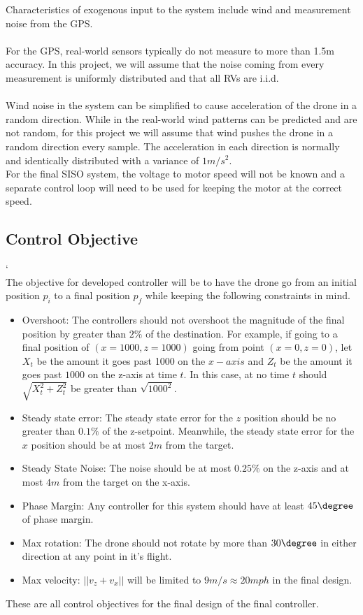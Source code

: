     Characteristics of exogenous input to the system include wind and measurement noise from the GPS.\\
    \\
    For the GPS, real-world sensors typically do not measure to more than 1.5m accuracy.
    In this project, we will assume that the noise coming from every measurement is uniformly distributed
    and that all RVs are i.i.d.\\
    \\
    Wind noise in the system can be simplified to cause acceleration of the drone in a random direction.
    While in the real-world wind patterns can be predicted and are not random, for this project we will assume that wind
    pushes the drone in a random direction every sample.
    The acceleration in each direction is normally and identically distributed with a variance of $1m/s^2$.
    \\
    For the final SISO system, the voltage to motor speed will not be known and a separate control loop will need to be used
    for keeping the motor at the correct speed.

    \subsection{Control Objective}\label{subsec:control-objective}
`   \\
    The objective for developed controller will be to have the drone go from an initial position $p_i$ to
    a final position $p_f$ while keeping the following constraints in mind.\\
    \begin{itemize}
        \item Overshoot: The controllers should not overshoot the magnitude of the final position by
            greater than $2\%$ of the destination.
            For example, if going to a final position of $(x = 1000, z = 1000)$
            going from point $(x=0, z=0)$, let $X_t$ be the amount it goes past 1000 on the $x-axis$ and
            $Z_t$ be the amount it goes past $1000$ on the z-axis at time $t$.
            In this case, at no time $t$ should $\sqrt{X_t^2 + Z_t^2}$ be greater than $\sqrt{1000^2}$.
        \item Steady state error: The steady state error for the $z$ position should be no greater than $0.1\%$ of the
            z-setpoint.
            Meanwhile, the steady state error for the $x$ position should be at most $2m$ from the target.
        \item Steady State Noise: The noise should be at most $0.25\%$ on the z-axis and at most $4m$ from the target
            on the x-axis.
        \item Phase Margin: Any controller for this system should have at least $45 \degree$ of phase margin.
        \item Max rotation: The drone should not rotate by more than $30 \degree$ in either direction at any point in it's flight.
        \item Max velocity: $||v_z + v_x||$ will be limited to $9m/s \approx 20 mph$ in the final design.
    \end{itemize}

    These are all control objectives for the final design of the final controller.